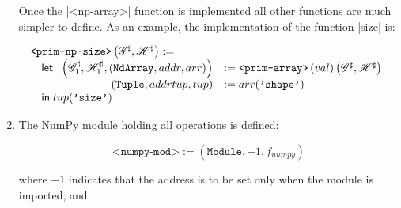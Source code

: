 \begin{enumerate}
  Once the \pycode|<np-array>| function is
  implemented all other functions are much simpler to define. As an
  example, the implementation of the function \pycode|size| is:

\[
\begin{array}[t]{l}
\texttt{<prim-np-size>}\left(\mathscr{G}^\sharp, \mathscr{H}^\sharp\right) := \\
\quad \mathsf{let}\;
  \begin{array}[t]{rl}
    \left(\mathscr{G}_1^\sharp, \mathscr{H}_1^\sharp, (\texttt{NdArray}, addr, arr)\right) &:= \texttt{<prim-array>}\left(val\right)\left(\mathscr{G}^\sharp, \mathscr{H}^\sharp\right) \\
      (\texttt{Tuple}, addrtup, tup) &:= arr(\texttt{'shape'})
  \end{array} \\
\quad \mathsf{in}\; tup(\texttt{'size'})
\end{array}
\]


%
\item The NumPy module holding all operations is defined:

\[\texttt{<numpy-mod>} := \left(\texttt{Module}, -1, f_{\textit{numpy}}\right)\]

where \(-1\) indicates that the address is to be set only when the module is imported, and


\end{enumerate}
